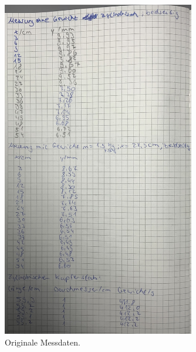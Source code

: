 \begin{figure}[H]
    \centering
    \includegraphics[width=0.75\textwidth]{Dateien/Bild3.jpeg}
    \caption{Originale Messdaten.}
    \label{fig:daten3}
\end{figure}


